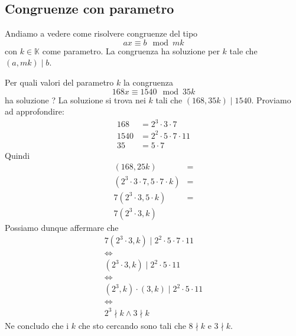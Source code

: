 \subsection{Congruenze con parametro}
Andiamo a vedere come risolvere congruenze del tipo
\begin{equation*}
	ax \equiv b \mod{mk}
\end{equation*}
con $k \in \mathbb{K}$ come parametro. La congruenza ha soluzione per $k$ tale che
$(a, mk) \mid b$.

\begin{example}
	Per quali valori del parametro $k$ la congruenza
	\begin{equation*}
		168x \equiv 1540 \mod{35k}
	\end{equation*}
	ha soluzione ?
	La soluzione si trova nei $k$ tali che $(168, 35k) \mid 1540$.
	Proviamo ad approfondire:
	\begin{equation*}
		\begin{array}{ll}
			168  & = 2^3 \cdot 3 \cdot 7          \\
			1540 & = 2^2 \cdot 5 \cdot 7 \cdot 11 \\
			35   & = 5 \cdot 7
		\end{array}
	\end{equation*}
	Quindi
	\begin{equation*}
		\begin{array}{ll}
			(168, 25k)                               & = \\
			(2^3 \cdot 3 \cdot 7, 5 \cdot 7 \cdot k) & = \\
			7 (2^3 \cdot 3, 5 \cdot k)               & = \\
			7 (2^3 \cdot 3, k)
		\end{array}
	\end{equation*}
	Possiamo dunque affermare che
	\begin{equation*}
		\begin{array}{c}
			7 (2^3 \cdot 3, k) \mid 2^2 \cdot 5 \cdot 7 \cdot 11 \\
			\Leftrightarrow                                      \\
			(2^3 \cdot 3, k) \mid 2^2 \cdot 5 \cdot 11           \\
			\Leftrightarrow                                      \\
			(2^3, k) \cdot (3, k) \mid 2^2 \cdot 5 \cdot 11      \\
			\Leftrightarrow                                      \\
			2^3 \nmid k \wedge 3 \nmid k
		\end{array}
	\end{equation*}
	Ne concludo che i $k$ che sto cercando sono tali che $8 \nmid k$ e $3 \nmid k$.
\end{example}

